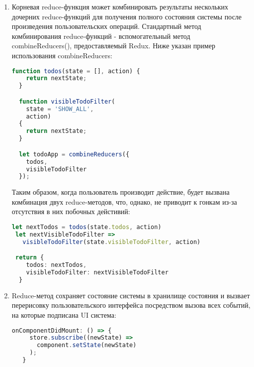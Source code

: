 \begin{enumerate}[label=\arabic*.]
\item
  Корневая reduce-функция может комбинировать результаты нескольких дочерних reduce-функций для получения полного состояния системы после произведения пользовательских операций.
  Стандартный метод комбинирования reduce-функций - вспомогательный метод combineReducers(), предоставляемый Redux. Ниже указан пример использования combineReducers:

  \begin{lstlisting}[language=TypeScript, label=lst:domain:redux3] 
  function todos(state = [], action) {
    return nextState;
  }

  function visibleTodoFilter(
    state = 'SHOW_ALL',
    action)
  {
    return nextState;
  }

  let todoApp = combineReducers({
    todos,
    visibleTodoFilter
  });

 \end{lstlisting}

 Таким образом, когда пользователь производит действие, будет вызвана комбинация двух reduce-методов, что,
 однако, не приводит к гонкам из-за отсутствия в них побочных дейстивий:
 
 \begin{lstlisting}[language=TypeScript, label=lst:domain:redux4]
 let nextTodos = todos(state.todos, action)
 let nextVisibleTodoFilter =>
   visibleTodoFilter(state.visibleTodoFilter, action)

 return {
    todos: nextTodos,
    visibleTodoFilter: nextVisibleTodoFilter
  }
 \end{lstlisting}

\item
 Reduce-метод сохраняет состояние системы в хранилище состояния и вызвает перерисовку пользовательского интерфейса посредством вызова всех событий, на которые подписана UI система:

 \begin{lstlisting}[language=TypeScript, label=lst:domain:redux5]
   onComponentDidMount: () => {
     store.subscribe((newState) =>
       component.setState(newState)
     );
   } 
 \end{lstlisting}

\end{enumerate}